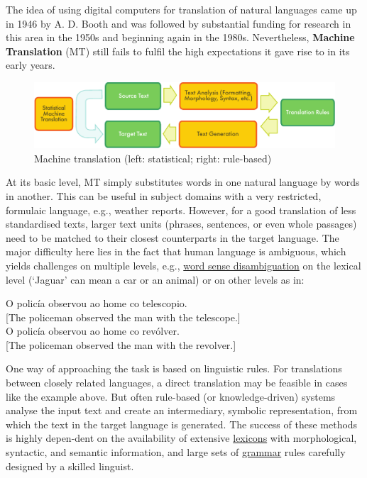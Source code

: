 \begin{multicols}{2}
\begin{itemize}
\begin{multicols}{2}
The idea of using digital computers for translation of natural languages came up in 1946 by A. D. Booth and was followed by substantial funding for research in this area in the 1950s and beginning again in the 1980s. Nevertheless, \textbf{Machine Translation} (MT) still fails to fulfil the high expectations it gave rise to in its early years. 


\begin{figure}[htb]
  \center
  \includegraphics[width=\textwidth]{../_media/english/machine_translation}
  \caption{Machine translation (left: statistical; right: rule-based)}
  \label{fig:mtarch_en}
\end{figure}

At its basic level, MT simply substitutes words in one natural language by words in another. This can be useful in subject domains with a very restricted, formulaic language, e.g., weather reports. However, for a good translation of less standardised texts, larger text units (phrases, sentences, or even whole passages) need to be matched to their closest counterparts in the target language. The major difficulty here lies in the fact that human language is ambiguous, which yields challenges on multiple levels, e.g., \uline{word sense disambiguation} on the lexical level (‘Jaguar’ can mean a car or an animal) or on other levels as in:

\hspace{8pt}O policía observou ao home co telescopio. \\
\hspace{8pt}[The policeman observed the man with the telescope.] \\
\hspace{8pt}O policía observou ao home co revólver. \\
\hspace{8pt}[The policeman observed the man with the revolver.]

One way of approaching the task is based on linguistic rules. For translations between closely related languages, a direct translation may be feasible in cases like the example above. But often rule-based (or knowledge-driven) systems analyse the input text and create an intermediary, symbolic representation, from which the text in the target language is generated. The success of these methods is highly depen-dent on the availability of extensive \uline{lexicons} with morphological, syntactic, and semantic information, and large sets of \uline{grammar} rules carefully designed by a skilled linguist.


\end{multicols}
\end{itemize}
\end{multicols}
